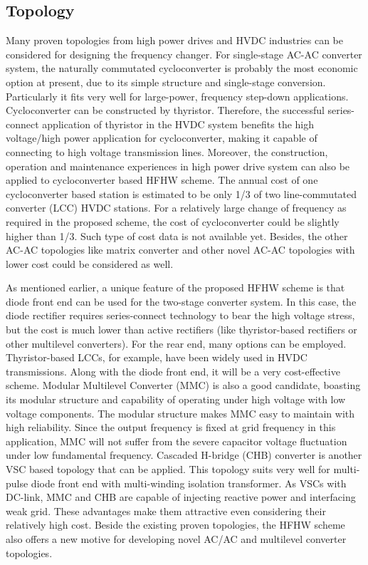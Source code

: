 \documentclass[12pt,a4paper]{reportmod}
\begin{document}
\subsection{Topology}
\par Many proven topologies from high power drives and HVDC industries can be considered for designing the frequency changer. For single-stage AC-AC converter system, the naturally commutated cycloconverter is probably the most economic option at present, due to its simple structure and single-stage conversion. Particularly it fits very well for large-power, frequency step-down applications. Cycloconverter can be constructed by thyristor. Therefore, the successful series-connect application of thyristor in the HVDC system benefits the high voltage/high power application for cycloconverter, making it capable of connecting to high voltage transmission lines. Moreover, the construction, operation and maintenance experiences in high power drive system can also be applied to cycloconverter based HFHW scheme. The annual cost of one cycloconverter based station is estimated to be only 1/3 of two line-commutated converter (LCC) HVDC stations. For a relatively large change of frequency as required in the proposed scheme, the cost of cycloconverter could be slightly higher than 1/3. Such type of cost data is not available yet. Besides, the other AC-AC topologies like matrix converter and other novel AC-AC topologies with lower cost could be considered as well.
\par As mentioned earlier, a unique feature of the proposed HFHW scheme is that diode front end can be used for the two-stage converter system. In this case, the diode rectifier requires series-connect technology to bear the high voltage stress, but the cost is much lower than active rectifiers (like thyristor-based rectifiers or other multilevel converters). For the rear end, many options can be employed. Thyristor-based LCCs, for example, have been widely used in HVDC transmissions. Along with the diode front end, it will be a very cost-effective scheme. Modular Multilevel Converter (MMC) is also a good candidate, boasting its modular structure and capability of operating under high voltage with low voltage components. The modular structure makes MMC easy to maintain with high reliability. Since the output frequency is fixed at grid frequency in this application, MMC will not suffer from the severe capacitor voltage fluctuation under low fundamental frequency. Cascaded H-bridge (CHB) converter is another VSC based topology that can be applied. This topology suits very well for multi-pulse diode front end with multi-winding isolation transformer. As VSCs with DC-link, MMC and CHB are capable of injecting reactive power and interfacing weak grid. These advantages make them attractive even considering their relatively high cost. Beside the existing proven topologies, the HFHW scheme also offers a new motive for developing novel AC/AC and multilevel converter topologies.
\end{document}
